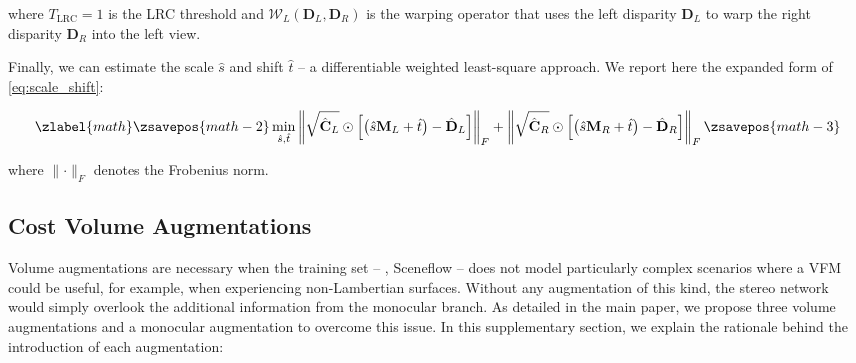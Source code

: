 \documentclass[10pt,twocolumn,letterpaper]{article}
\begin{document}
\normalsize
where $T_\text{LRC}=1$ is the LRC threshold and $\mathcal{W}_L(\mathbf{D}_L,\mathbf{D}_R)$ is the warping operator that uses the left disparity $\mathbf{D}_L$ to warp the right disparity $\mathbf{D}_R$ into the left view.

Finally, we can estimate the scale $\hat{s}$ and shift $\hat{t}$  -- a differentiable weighted least-square approach. We report here the expanded form of \cref{eq:scale_shift}:
\small

\begin{equation}
\zlabel{math}
    \zsavepos{math-2}
    \min_{\hat{s}, \hat{t}} \left\lVert \sqrt{\hat{\mathbf{C}}_L}\odot\left[\left(\hat{s}\mathbf{M}_L + \hat{t}\right)  - \hat{\mathbf{D}}_L \right] \right\rVert_F + \left\lVert \sqrt{\hat{\mathbf{C}}_R}\odot\left[\left(\hat{s}\mathbf{M}_R + \hat{t}\right)  - \hat{\mathbf{D}}_R \right] \right\rVert_F
    \label{eq:scale_shift2}
    \zsavepos{math-3}\end{equation}

\normalsize
where $\lVert\cdot\rVert_F$ denotes the Frobenius norm.


\phantom{Invisible Text}
\vspace{-\baselineskip}

\subsection{Cost Volume Augmentations}

\label{subsec:cost_aug}

Volume augmentations are necessary when the training set -- \eg, Sceneflow \cite{mayer2016large} -- does not model particularly complex scenarios where a VFM could be useful, for example, when experiencing non-Lambertian surfaces.
Without any augmentation of this kind, the stereo network would simply overlook the additional information from the monocular branch.
As detailed in the main paper, we propose three volume augmentations and a monocular augmentation to overcome this issue.
In this supplementary section, we explain the rationale behind the introduction of each augmentation:
\end{document}
